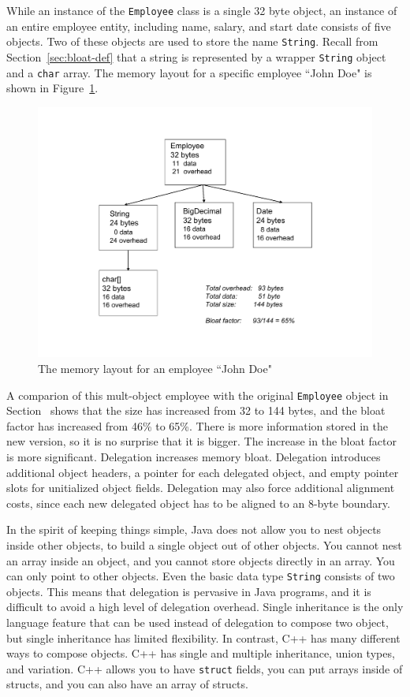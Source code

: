 While an instance of the \texttt{Employee} class is a single 32 byte object, an instance of an entire employee entity, including name, salary, and start date consists of five objects. Two of these objects are used to store the name \texttt{String}. Recall from Section~\ref{sec:bloat-def} that a string is represented by a wrapper \texttt{String} object and a \texttt{char} array. The memory layout for a specific employee ``John Doe" is shown in Figure~\ref{fig:employee-status}. 
 \begin{figure}
  \centering
 \includegraphics[width=.60\textwidth]{Figures/chapter4/employee-status.pdf}
  \caption{The memory layout for an employee ``John Doe"}
  \label{fig:employee-status}
\end{figure}

A comparion of this mult-object employee with the original \texttt{Employee} object in Section~\cite{CostOfObects} shows that the size has increased from 32 to 144 bytes, and the bloat factor has increased from 46\% to 65\%. There is more information stored in the new version, so it is no surprise that it is bigger. The increase in the bloat factor is more significant. Delegation increases memory bloat. Delegation introduces additional object headers, a pointer for each delegated object, and empty pointer slots for unitialized object fields. Delegation may also force additional alignment costs, since each new delegated object has to be aligned to an 8-byte boundary. 

In the spirit of keeping things simple, Java does not allow you to nest objects inside other objects, to build a single object out of other objects. You cannot nest an array inside an object, and you cannot store objects directly in an array.  You can only point to other objects. Even the basic data type \texttt{String} consists of two objects. This means that delegation is pervasive in Java programs, and it is difficult to avoid a high level of delegation overhead. Single inheritance is the only language feature that can be used instead of delegation to compose two object, but single inheritance has limited flexibility.  In contrast, C++ has many different ways to compose objects. C++ has single and multiple inheritance, union types, and variation. C++ allows you to have \texttt{struct} fields, you can put arrays inside of structs, and you can also have an array of structs.  

